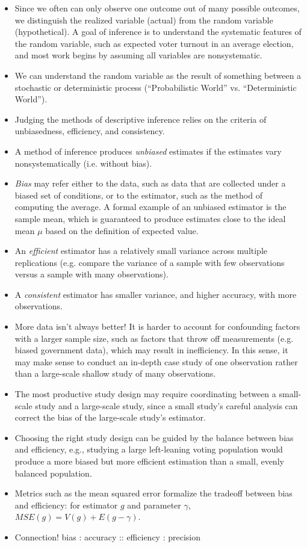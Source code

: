 \documentclass[11pt,letterpaper]{article}
\begin{document}
\begin{itemize}
\item Since we often can only observe one outcome out of many possible outcomes, we distinguish the realized variable (actual) from the random variable (hypothetical). A goal of inference is to understand the systematic features of the random variable, such as expected voter turnout in an average election, and most work begins by assuming all variables are nonsystematic.
\item We can understand the random variable as the result of something between a stochastic or deterministic process (``Probabilistic World'' vs. ``Deterministic World'').
\item Judging the methods of descriptive inference relies on the criteria of unbiasedness, efficiency, and consistency. 
\item A method of inference produces \emph{unbiased} estimates if the estimates vary nonsystematically (i.e. without bias). 
\item \emph{Bias} may refer either to the data, such as data that are collected under a biased set of conditions, or to the estimator, such as the method of computing the average. A formal example of an unbiased estimator is the sample mean, which is guaranteed to produce estimates close to the ideal mean $\mu$ based on the definition of expected value.
\item An \emph{efficient} estimator has a relatively small variance across multiple replications (e.g. compare the variance of a sample with few observations versus a sample with many observations).
\item A \emph{consistent} estimator has smaller variance, and higher accuracy, with more observations.
\item More data isn't always better! It is harder to account for confounding factors with a larger sample size, such as factors that throw off measurements (e.g. biased government data), which may result in inefficiency. In this sense, it may make sense to conduct an in-depth case study of one observation rather than a large-scale shallow study of many observations.
\item The most productive study design may require coordinating between a small-scale study and a large-scale study, since a small study's careful analysis can correct the bias of the large-scale study's estimator. 
\item Choosing the right study design can be guided by the balance between bias and efficiency, e.g., studying a large left-leaning voting population would produce a more biased but more efficient estimation than a small, evenly balanced population.
\item Metrics such as the mean squared error formalize the tradeoff between bias and efficiency: for estimator $g$ and parameter $\gamma$, $MSE(g) = V(g) + E(g - \gamma)$.
\item Connection! bias : accuracy :: efficiency : precision
\end{itemize}
\end{document}
